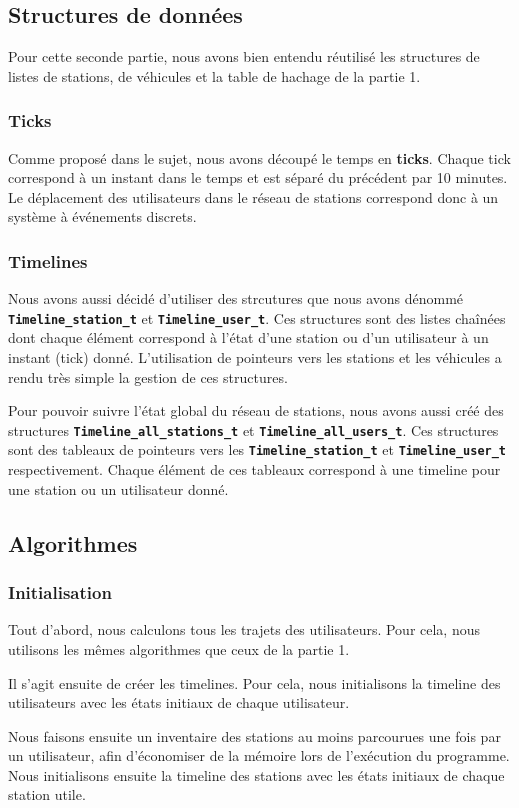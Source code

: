 \documentclass[a4paper, 12pt]{report}
\begin{document}
\subsection{Structures de données}
Pour cette seconde partie, nous avons bien entendu réutilisé les structures de listes de stations, de véhicules et la table de hachage de la partie 1.\par\bigskip
\subsubsection{Ticks}
Comme proposé dans le sujet, nous avons découpé le temps en \textbf{ticks}. Chaque tick correspond à un instant dans le temps et est séparé du précédent par 10 minutes. Le déplacement des utilisateurs dans le réseau de stations correspond donc à un système à événements discrets.\par\bigskip
\subsubsection{Timelines}
Nous avons aussi décidé d'utiliser des strcutures que nous avons dénommé \textbf{\texttt{Timeline_station_t}} et \textbf{\texttt{Timeline_user_t}}. Ces structures sont des listes chaînées dont chaque élément correspond à l'état d'une station ou d'un utilisateur à un instant (tick) donné. L'utilisation de pointeurs vers les stations et les véhicules a rendu très simple la gestion de ces structures.\par\bigskip
Pour pouvoir suivre l'état global du réseau de stations, nous avons aussi créé des structures \textbf{\texttt{Timeline_all_stations_t}} et \textbf{\texttt{Timeline_all_users_t}}. Ces structures sont des tableaux de pointeurs vers les \textbf{\texttt{Timeline_station_t}} et \textbf{\texttt{Timeline_user_t}} respectivement. Chaque élément de ces tableaux correspond à une timeline pour une station ou un utilisateur donné.\par\bigskip
\subsection{Algorithmes}
\subsubsection{Initialisation}
Tout d'abord, nous calculons tous les trajets des utilisateurs. Pour cela, nous utilisons les mêmes algorithmes que ceux de la partie 1.\par\bigskip
Il s'agit ensuite de créer les timelines. Pour cela, nous initialisons la timeline des utilisateurs avec les états initiaux de chaque utilisateur.\par\bigskip
Nous faisons ensuite un inventaire des stations au moins parcourues une fois par un utilisateur, afin d'économiser de la mémoire lors de l'exécution du programme. Nous initialisons ensuite la timeline des stations avec les états initiaux de chaque station utile.\par\bigskip
\end{document}
